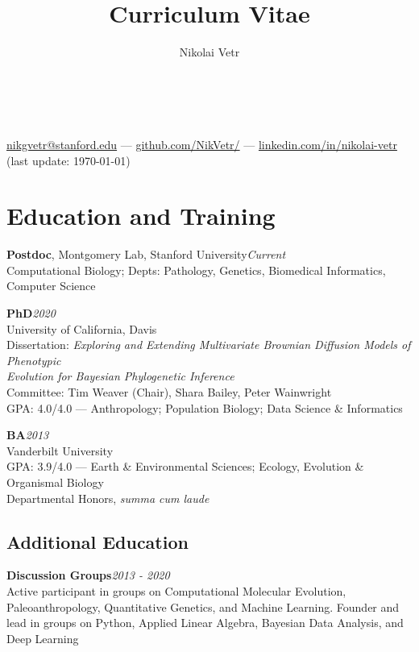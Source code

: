 \documentclass[12pt]{article}
\makeatletter
\newcommand{\cvcolor}{\color{DarkRed}} %
\renewcommand{\maketitle}{
\begin{center}

{\Huge\theauthor}\\
\vspace{0.25em}
{\Large \cvcolor{Stanford University, California}}\\

\href{mailto:nikgvetr@stanford.edu}{nikgvetr@stanford.edu} --- \href{https://www.github.com/NikVetr/}{github.com/NikVetr/} --- \href{https://www.linkedin.com/in/nikolai-vetr}{linkedin.com/in/nikolai-vetr}\\

{\color{Gray}(last update: \today)}
\end{center}
}
\makeatother
\begin{document}
\title{Curriculum Vitae} %
\author{Nikolai Vetr}

\maketitle

\vspace{-1.5em}

\section{Education and Training}

\textbf{Postdoc}, Montgomery Lab, Stanford University\hfill\emph{Current}\\
Computational Biology; Depts: Pathology, Genetics, Biomedical Informatics, Computer Science
\vspace{-0.25em}

\textbf{PhD}\hfill\emph{2020}\\
University of California, Davis\\
Dissertation: \textit{Exploring and Extending Multivariate Brownian Diffusion Models of Phenotypic\\
\hspace*{22mm} Evolution for Bayesian Phylogenetic Inference}\\
Committee: Tim Weaver (Chair), Shara Bailey, Peter Wainwright\\
GPA: 4.0/4.0 — Anthropology; Population Biology; Data Science \& Informatics

\textbf{BA}\hfill\emph{2013}\\
Vanderbilt University\\
GPA: 3.9/4.0 — Earth \& Environmental Sciences; Ecology, Evolution \& Organismal Biology\\
Departmental Honors, \textit{summa cum laude}\\
\vspace{-1.25em}
\subsection{Additional Education}

\textbf{Discussion Groups}\hfill\emph{2013 - 2020}\\
Active participant in groups on Computational Molecular Evolution, Paleoanthropology, Quantitative Genetics, and Machine Learning. Founder and lead in groups on Python, Applied Linear Algebra, Bayesian Data Analysis, and Deep Learning
\end{document}
